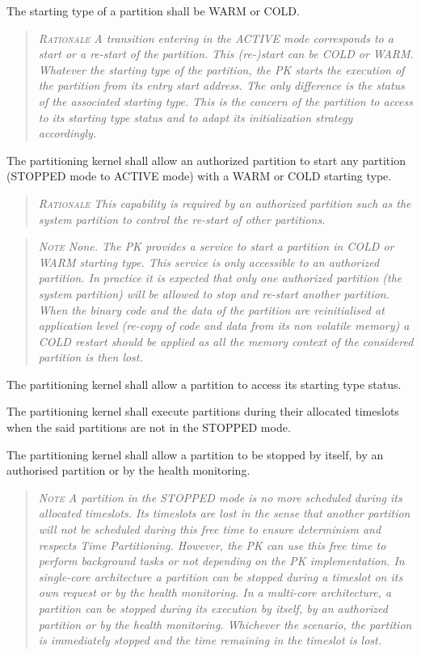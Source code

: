 The starting type of a partition shall be WARM or COLD.
\begin{quote}\it
\textsc{Rationale}
A transition entering in the ACTIVE mode corresponds to a start or a re-start of the partition. This (re-)start can be COLD or WARM. Whatever the starting type of the partition, the PK starts the execution of the partition from its entry start address.  The only difference is the status of the associated starting type. This is the concern of the partition to access to its starting type status and to adapt its initialization strategy accordingly.
\end{quote}

The partitioning kernel shall allow an authorized partition to start any partition (STOPPED mode to ACTIVE mode)  with a WARM or COLD starting type.
\begin{quote}\it
\textsc{Rationale}
 This capability is required by an authorized partition such as the system partition to control the re-start of other partitions.
\end{quote}
\begin{quote}\it
\textsc{Note}
None. The PK provides a service to start a partition in COLD or WARM starting type. This service is only accessible to an authorized partition.
In practice it is expected that only one authorized partition (the system partition) will be allowed to stop and re-start another partition. When the binary code and the data of the partition are reinitialised at application level (re-copy of code and data from its non volatile memory) a COLD restart should be applied as all the memory context of the considered partition is then lost.
\end{quote}

The partitioning kernel shall allow a partition to access its starting type status.

The partitioning kernel shall execute partitions during their allocated timeslots when the said partitions are not in the STOPPED mode.

The partitioning kernel shall allow a partition to be stopped by itself, by an authorised partition or by the health monitoring.
\begin{quote}\it
\textsc{Note}
A partition in the STOPPED mode is no more scheduled during its allocated timeslots. Its  timeslots are lost in the sense that another partition will not be scheduled during this free time to ensure determinism and respects Time Partitioning. However, the PK can use this free time to perform background tasks or not depending on the PK implementation.  In single-core architecture a partition can be stopped during a timeslot on its own request or by the health monitoring. In a multi-core architecture, a partition can be stopped during its execution by itself, by an authorized partition or by the health monitoring. Whichever the scenario, the partition is immediately stopped and the time remaining in the timeslot is lost.
\end{quote}

